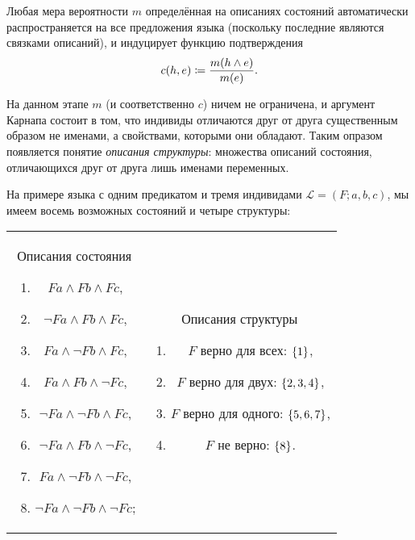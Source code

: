 \documentclass[14pt, a4paper, pdftex]{extarticle}
\begin{document}
Любая мера вероятности $m$ определённая на описаниях состояний автоматически распространяется на все предложения языка (поскольку последние являются связками описаний), и индуцирует функцию подтверждения
\[
	c(h, e) \coloneqq \frac{m(h\land e)}{m(e)}.
\]

На данном этапе $m$ (и соответственно $c$) ничем не ограничена, и аргумент Карнапа состоит в том, что индивиды отличаются друг от друга существенным образом не именами, а свойствами, которыми они обладают. Таким опразом появляется понятие \emph{описания структуры}: множества описаний состояния, отличающихся друг от друга лишь именами переменных. 

На примере языка с одним предикатом и тремя индивидами $\mathcal{L} = (F; a,b,c)$, мы имеем восемь возможных состояний и четыре структуры:
\begin{table}[h]
\centering
\begin{tabular}{cc}
\begin{minipage}[t]{.3\linewidth}
Описания состояния
\begin{enumerate}
\item $Fa\land Fb\land Fc$,\label{it:allF}
\item $\lnot Fa\land Fb\land Fc$,\label{it:oneFf}
\item $Fa\land \lnot Fb\land Fc$,\label{it:oneFs}
\item $Fa\land Fb\land \lnot Fc$,\label{it:oneFt}
\item $\lnot Fa \land \lnot Fb\land Fc$,\label{it:twoFf}
\item $\lnot Fa \land Fb \land\lnot Fc$,\label{it:twoFs}
\item $Fa \land\lnot Fb \land\lnot Fc$,\label{it:twoFt}
\item $\lnot Fa \land\lnot Fb\land\lnot Fc$;\label{it:noneF}
\end{enumerate}
\end{minipage}
%
&
%
\begin{minipage}[t]{.3\linewidth}
Описания структуры
\begin{enumerate}
\item $F$ верно для всех: $\Set{1}$,
\item $F$ верно для двух: $\Set{2,3,4}$,
\item $F$ верно для одного: $\Set{5,6,7}$,
\item $F$ не верно: $\Set{8}$.
\end{enumerate}
\end{minipage}
\end{tabular}
\end{table}
\end{document}
